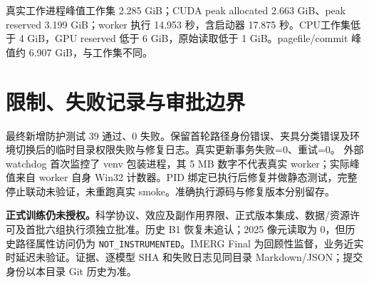 \documentclass[UTF8,a4paper,11pt]{ctexart}
\begin{document}
真实工作进程峰值工作集 2.285 GiB；CUDA peak allocated 2.663 GiB、peak reserved 3.199 GiB；worker 执行 14.953 秒，含启动器 17.875 秒。CPU工作集低于 4 GiB，GPU reserved 低于 6 GiB，原始读取低于 1 GiB。pagefile/commit 峰值约 6.907 GiB，与工作集不同。

\section*{限制、失败记录与审批边界}
最终新增防护测试 39 通过、0 失败。保留首轮路径身份错误、夹具分类错误及环境切换后的临时目录权限失败与修复日志。真实更新事务失败=0、重试=0。
外部 watchdog 首次监控了 venv 包装进程，其 5 MB 数字不代表真实 worker；实际峰值来自 worker 自身 Win32 计数器。PID 绑定已执行后修复并做静态测试，完整停止联动未验证，未重跑真实 smoke。准确执行源码与修复版本分别留存。

\textbf{正式训练仍未授权。}科学协议、效应及副作用界限、正式版本集成、数据/资源许可及首批六组执行须独立批准。历史 B1 恢复未追认；2025 像元读取为 0，但历史路径属性访问仍为 \texttt{NOT\_INSTRUMENTED}。IMERG Final 为回顾性监督，业务近实时延迟未验证。证据、逐模型 SHA 和失败日志见同目录 Markdown/JSON；提交身份以本目录 Git 历史为准。
\end{document}
